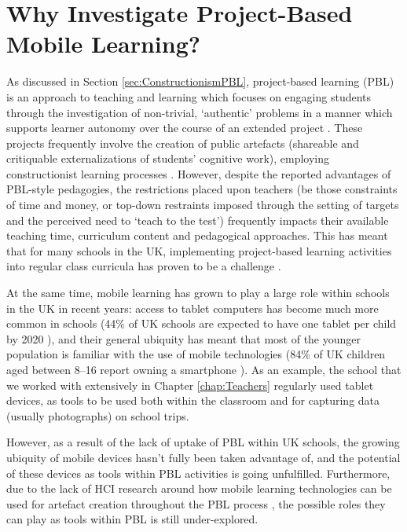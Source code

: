 \section{Why Investigate Project-Based Mobile Learning?}
As discussed in Section \ref{sec:ConstructionismPBL}, project-based learning (PBL) is an approach to teaching and learning which focuses on engaging students through the investigation of non-trivial, `authentic' problems in a manner which supports learner autonomy over the course of an extended project \citep{Blumenfeld1991}. These projects frequently involve the creation of public artefacts (shareable and critiquable externalizations of students' cognitive work), employing constructionist learning processes \citep{PapertSeymourandHarel1991a, Holubova2008}. However, despite the reported advantages of PBL-style pedagogies, the restrictions placed upon teachers (be those constraints of time and money, or top-down restraints imposed through the setting of targets and the perceived need to `teach to the test') frequently impacts their available teaching time, curriculum content and pedagogical approaches. This has meant that for many schools in the UK, implementing project-based learning activities into regular class curricula has proven to be a challenge \citep{TheEducationEndowmentFoundation2016}.

At the same time, mobile learning has grown to play a large role within schools in the UK in recent years: access to tablet computers has become much more common in schools (44\% of UK schools are expected to have one tablet per child by 2020 \citep{BritishEducationalSuppliersAssociation2015}), and their general ubiquity has meant that most of the younger population is familiar with the use of mobile technologies (84\% of UK children aged between 8--16 report owning a smartphone \citep{Statistica2018a}). As an example, the school that we worked with extensively in Chapter \ref{chap:Teachers} regularly used tablet devices, as tools to be used both within the classroom and for capturing data (usually photographs) on school trips.

However, as a result of the lack of uptake of PBL within UK schools, the growing ubiquity of mobile devices hasn't fully been taken advantage of, and the potential of these devices as tools within PBL activities is going unfulfilled. Furthermore, due to the lack of HCI research around how mobile learning technologies can be used for artefact creation throughout the PBL process \citep{Chan2015}, the possible roles they can play as tools within PBL is still under-explored.

